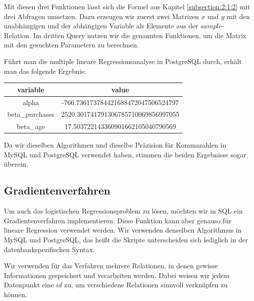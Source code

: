 Mit diesen drei Funktionen lässt sich die Formel aus Kapitel \ref{subsection:2:1:2} mit drei Abfragen umsetzen. Dazu erzeugen wir zuerst zwei Matrizen $x$ und $y$ mit den unabhängigen und der abhängigen Variable als Elemente aus der $sample$-Relation. Im dritten Query nutzen wir die genannten Funktionen, um die Matrix mit den gesuchten Parametern zu berechnen.

Führt man die multiple lineare Regressionsanalyse in PostgreSQL durch, erhält man das folgende Ergebnis:

\begin{center}
  \begin{tabular}{|c|c|}\hline
    \textbf{variable} & \textbf{value} \\ \hline
    alpha & -766.736173784421688472047506524797 \\ \hline
    beta\_purchases & 2520.301741791306785710069856997055 \\ \hline
    beta\_age & 17.503722143360901662105040790569 \\ \hline
  \end{tabular}
\end{center}

Da wir dieselben Algorithmen und dieselbe Präzision für Kommazahlen in MySQL und PostgreSQL verwendet haben, stimmen die beiden Ergebnisse sogar überein.

\subsection{Gradientenverfahren}
\label{subsection:3:4:3}

Um auch das logistischen Regressionsproblem zu lösen, möchten wir in SQL ein Gradientenverfahren implementieren. Diese Funktion kann aber genauso für lineare Regression verwendet werden. Wir verwenden denselben Algorithmus in MySQL und PostgreSQL, das heißt die Skripte unterscheiden sich lediglich in der datenbankspezifischen Syntax.

Wir verwenden für das Verfahren mehrere Relationen, in denen gewisse Informationen gespeichert und verarbeiten werden. Dabei weisen wir jedem Datenpunkt eine $id$ zu, um verschiedene Relationen sinnvoll verknüpfen zu können.


